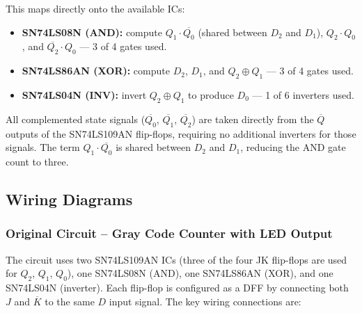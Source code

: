\documentclass[12pt, letterpaper]{article}
\begin{document}
This maps directly onto the available ICs:
\begin{itemize}
  \item \textbf{SN74LS08N (AND):} compute $Q_1\cdot\overline{Q_0}$ (shared between
        $D_2$ and $D_1$), $Q_2\cdot Q_0$, and $\overline{Q_2}\cdot Q_0$
        --- 3 of 4 gates used.
  \item \textbf{SN74LS86AN (XOR):} compute $D_2$, $D_1$, and $Q_2 \oplus Q_1$
        --- 3 of 4 gates used.
  \item \textbf{SN74LS04N (INV):} invert $Q_2 \oplus Q_1$ to produce $D_0$
        --- 1 of 6 inverters used.
\end{itemize}

All complemented state signals ($\overline{Q_0}$, $\overline{Q_1}$, $\overline{Q_2}$)
are taken directly from the $\overline{Q}$ outputs of the SN74LS109AN flip-flops,
requiring no additional inverters for those signals.  The term $Q_1\cdot\overline{Q_0}$
is shared between $D_2$ and $D_1$, reducing the AND gate count to three.

\subsection{Wiring Diagrams}

\subsubsection*{Original Circuit -- Gray Code Counter with LED Output}

The circuit uses two SN74LS109AN ICs (three of the four JK flip-flops are used for
$Q_2$, $Q_1$, $Q_0$), one SN74LS08N (AND), one SN74LS86AN (XOR), and one SN74LS04N
(inverter).  Each flip-flop is configured as a DFF by connecting both $J$ and
$\overline{K}$ to the same $D$ input signal.  The key wiring connections are:
\end{document}

